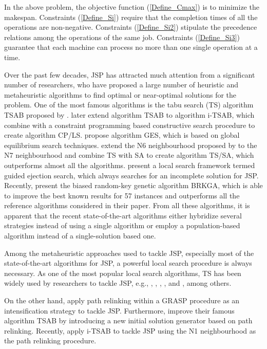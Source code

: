 \documentclass[authoryear,12pt]{elsarticle}
\begin{document}
In the above problem, the objective function (\ref{Define_Cmax}) is to minimize the makespan. Constraints (\ref{Define_Si}) require that the completion times of all the operations are non-negative. Constraints (\ref{Define_Si2}) stipulate the precedence relations among the operations of the same job. Constraints (\ref{Define_Si3}) guarantee that each machine can process no more than one single operation at a time.

Over the past few decades, JSP has attracted much attention from a significant number of researchers, who have proposed a large number of heuristic and metaheuristic algorithms to find optimal or near-optimal solutions for the problem. One of the most famous algorithms is the tabu search (TS) algorithm TSAB proposed by \cite{Nowicki1996TSAB}. \cite{Nowicki2005i-TSAB} later extend algorithm TSAB to algorithm i-TSAB, which \cite{Beck2011CP/LS} combine with a constraint programming based constructive search procedure to create algorithm CP/LS. \cite{Pardalos2006GES} propose algorithm GES, which is based on global equilibrium search techniques. \cite{Zhang2007TS} extend the N6 neighbourhood proposed by \cite{Balas1998GLS} to the N7 neighbourhood and \cite{Zhang2008TSSA} combine TS with SA to create algorithm TS/SA, which outperforms almost all the algorithms. \cite{Nagata2009GES} present a local search framework termed guided ejection search, which always searches for an incomplete solution for JSP. Recently, \cite{Goncalves2013BRKGA} present the biased random-key genetic algorithm BRKGA, which is able to improve the best known results for 57 instances and outperforms all the reference algorithms considered in their paper. From all these algorithms, it is apparent that the recent state-of-the-art algorithms either hybridize several strategies instead of using a single algorithm or employ a population-based algorithm instead of a single-solution based one.

Among the metaheuristic approaches used to tackle JSP, especially most of the state-of-the-art algorithms for JSP, a powerful local search procedure is always necessary. As one of the most popular local search algorithms, TS has been widely used by researchers to tackle JSP, e.g., \cite{Nowicki2005i-TSAB}, \cite{Zhang2007TS}, \cite{Nasiri2012GES/TS}, \cite{Shen201214}, and \cite{Goncalves2013BRKGA}, among others.

On the other hand, \cite{Aiex2003GRASPwithPR} apply path relinking within a GRASP procedure as an intensification strategy to tackle JSP. Furthermore, \cite{Nowicki2005i-TSAB} improve their famous algorithm TSAB by introducing a new initial solution generator based on path relinking. Recently, \cite{Nasiri2012guidedTSPR} apply i-TSAB to tackle JSP using the N1 neighbourhood as the path relinking procedure.
\end{document}
